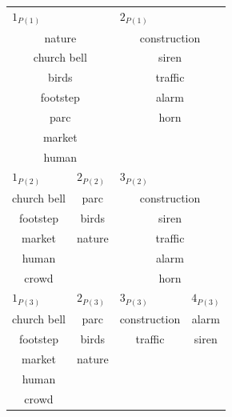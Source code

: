 \begin{table}[t]
\centering
\tiny
\begin{tabular}{c|c|c|c|c|c|c}
\multicolumn{3}{l|}{$1_{P(1)}$}  & \multicolumn{4}{l}{$2_{P(1)}$} \\
\multicolumn{3}{c|}{nature}      & \multicolumn{4}{c}{construction} \\
\multicolumn{3}{c|}{church bell} & \multicolumn{4}{c}{siren} \\
\multicolumn{3}{c|}{birds}       & \multicolumn{4}{c}{traffic} \\
\multicolumn{3}{c|}{footstep}    & \multicolumn{4}{c}{alarm} \\
\multicolumn{3}{c|}{parc}        & \multicolumn{4}{c}{horn} \\          
\multicolumn{3}{c|}{market}      & \multicolumn{4}{c}{} \\   
\multicolumn{3}{c|}{human}       & \multicolumn{4}{c}{} \\                                    
\hline
\multicolumn{2}{l|}{$1_{P(2)}$}  & \multicolumn{1}{l|}{$2_{P(2)}$} & \multicolumn{4}{l}{$3_{P(2)}$} \\
\multicolumn{2}{c|}{church bell} & parc   & \multicolumn{4}{c}{construction} \\
\multicolumn{2}{c|}{footstep}    & birds  & \multicolumn{4}{c}{siren} \\
\multicolumn{2}{c|}{market}      & nature & \multicolumn{4}{c}{traffic} \\
\multicolumn{2}{c|}{human}       &        & \multicolumn{4}{c}{alarm} \\	
\multicolumn{2}{c|}{crowd}       &        & \multicolumn{4}{c}{horn} \\	
\hline
\multicolumn{2}{l|}{$1_{P(3)}$}  & \multicolumn{1}{l|}{$2_{P(3)}$} & \multicolumn{3}{l|}{$3_{P(3)}$} & \multicolumn{1}{l}{$4_{P(3)}$} \\ 
\multicolumn{2}{c|}{church bell} & parc     & \multicolumn{3}{c|}{construction} & alarm \\         
\multicolumn{2}{c|}{footstep}    & birds    & \multicolumn{3}{c|}{traffic}      & siren\\ 
\multicolumn{2}{c|}{market}      & nature   & \multicolumn{3}{c|}{}             &  \\ 
\multicolumn{2}{c|}{human}       &          & \multicolumn{3}{c|}{}             &  \\            
\multicolumn{2}{c|}{crowd}       &          & \multicolumn{3}{c|}{}             &  \\      

\end{tabular}
\end{table}
